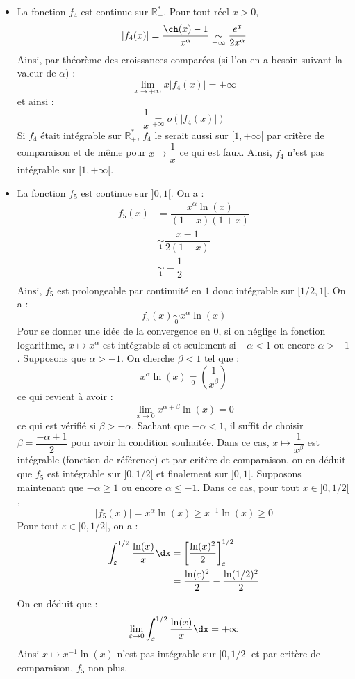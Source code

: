 \documentclass[a4paper,10pt]{report}
\begin{document}
\begin{itemize}
\item La fonction $f_4$ est continue sur $\mathbb{R}_+^*$. Pour tout réel $x>0$,
$$ \vert f_4(x) \vert = \dfrac{\ch(x)-1}{x^{\alpha}} \underset{+ \infty} {\sim}\dfrac{e^x}{2x^{\alpha}}$$
Ainsi, par théorème des croissances comparées (si l'on en a besoin suivant la valeur de $\alpha$) :
$$ \lim_{x \rightarrow + \infty} x \vert f_4(x) \vert = + \infty$$
et ainsi :
$$ \dfrac{1}{x} \underset{+\infty}{=} o (\vert f_4(x) \vert)$$
Si $f_4$ était intégrable sur $\mathbb{R}_+^{*}$, $f_4$ le serait aussi sur $[1, + \infty[$ par critère de comparaison et de même pour $x \mapsto \dfrac{1}{x}$ ce qui est faux. Ainsi, $f_4$ n'est pas intégrable sur $[1, + \infty[$.
\item La fonction $f_5$ est continue sur $]0,1[$. On a :
\begin{align*}
 f_5(x) & = \dfrac{x^{\alpha} \ln(x)}{(1-x)(1+x)} \\
 &  \underset{1}{\sim} \dfrac{x-1}{2(1-x)} \\
 &  \underset{1}{\sim} - \dfrac{1}{2} \\
 \end{align*}
 Ainsi, $f_5$ est prolongeable par continuité en $1$ donc intégrable sur $[1/2,1[$. On a :
 $$ f_5(x) \underset{0}{\sim} x^{\alpha} \ln(x)$$
Pour se donner une idée de la convergence en $0$, si on néglige la fonction logarithme, $x \mapsto x^{\alpha}$ est intégrable si et seulement si $- \alpha <1$ ou encore $\alpha>-1$. Supposons que $\alpha>-1$. On cherche $\beta <1$ tel que :
$$ x^{\alpha} \ln(x) \underset{0}{=} \left( \dfrac{1}{x^{\beta}} \right)$$
ce qui revient à avoir :
$$ \lim_{x \rightarrow 0} x^{\alpha+ \beta} \ln(x) = 0$$
ce qui est vérifié si $\beta > - \alpha$. Sachant que $-\alpha <1$, il suffit de choisir $\beta = \dfrac{-\alpha+1}{2}$ pour avoir la condition souhaitée. Dans ce cas, $x \mapsto \dfrac{1}{x^{\beta}}$ est intégrable (fonction de référence) et par critère de comparaison, on en déduit que $f_5$ est intégrable sur $]0,1/2[$ et finalement sur $]0,1[$. Supposons maintenant que $- \alpha \geq 1$ ou encore $\alpha \leq -1$. Dans ce cas, pour tout $x \in ]0,1/2[$,
$$ \vert f_5(x) \vert= x^{\alpha} \ln(x) \geq x^{-1} \ln(x) \geq 0$$
Pour tout $\varepsilon \in ]0,1/2[$, on a :
\begin{align*}
\int_{\varepsilon}^{1/2} \dfrac{\ln(x)}{x} \dx & = \left[ \dfrac{\ln(x)^2}{2} \right]_{\varepsilon}^{1/2} \\
& = \dfrac{\ln(\varepsilon)^2}{2} - \dfrac{\ln(1/2)^2}{2}
\end{align*}
On en déduit que :
$$ \lim_{\varepsilon \rightarrow 0}\int_{\varepsilon}^{1/2} \dfrac{\ln(x)}{x} \dx = + \infty$$
Ainsi $x \mapsto x^{-1} \ln(x)$ n'est pas intégrable sur $]0,1/2[$ et par critère de comparaison, $f_5$ non plus.


\end{itemize}
\end{document}
